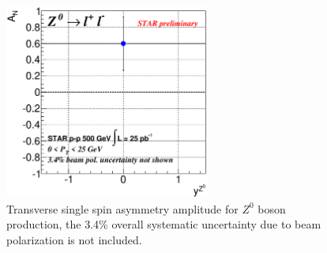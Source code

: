 \documentclass[12pt]{article}
\begin{document}
\begin{figure}[htbp]
  \centering
  \includegraphics[width=0.6\textwidth]{images/asymmetries/hd_Z0_AsymAmpSqrtVsRap}
  \caption{Transverse single spin asymmetry amplitude for $Z^{0}$ boson production, the 3.4\% overall systematic uncertainty due to beam polarization is not included.}
  \label{Fig:Z-An}
\end{figure}
\end{document}
